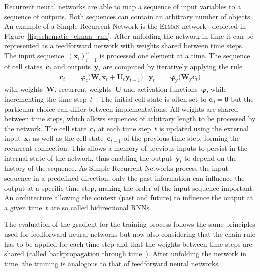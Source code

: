 Recurrent neural networks are able to map a sequence of input variables to a
sequence of outputs. Both sequences can contain an arbitrary number of objects.
An example of a Simple Recurrent Network is the \textsc{Elman}
network~\cite{elman} depicted in Figure~\ref{fig:schematic_elman_rnn}. After
unfolding the network in time it can be represented as a feedforward network
with weights shared between time steps. The input
sequence~$\left( \mathbf{x}_i \right)_{i=1}^n$ is processed one element at a
time. The sequence of cell states~$\mathbf{c}_t$ and outputs~$\mathbf{y}_t$ are
computed by iteratively applying the rule
\begin{align*}
  \mathbf{c}_t &= \bm{\varphi}_{\text{c}}\Big( \mathbf{W}_{\text{c}} \mathbf{x}_{t} + \mathbf{U}_{\text{c}} \mathbf{y}_{t-1} \Big)
  &\mathbf{y}_t &= \bm{\varphi}_{\text{y}}\Big( \mathbf{W}_{\text{y}} \mathbf{c}_{t} \Big)
\end{align*}
with weights~$\mathbf{W}$, recurrent weights~$\mathbf{U}$ and activation
functions~$\bm{\varphi}$, while incrementing the time step~$t$~\cite{elman,
  graves}. The initial cell state is often set to $\mathbf{c}_0 = \mathbf{0}$
but the particular choice can differ between implementations. All weights are
shared between time steps, which allows sequences of arbitrary length to be
processed by the network. The cell state~$\mathbf{c}_t$ at each time step~$t$ is
updated using the external input~$\mathbf{x}_t$ as well as the cell
state~$\mathbf{c}_{t-1}$ of the previous time step, forming the recurrent
connection. This allows a memory of previous inputs to persist in the internal
state of the network, thus enabling the output~$\mathbf{y}_t$ to depend on the
history of the sequence. As Simple Recurrent Networks process the input sequence
in a predefined direction, only the past information can influence the output at
a specific time step, making the order of the input sequence important. An
architecture allowing the context (past and future) to influence the output at a
given time~$t$ are so called bidirectional RNNs.

The evaluation of the gradient for the training process follows the same
principles used for feedforward neural networks but now also considering that
the chain rule has to be applied for each time step and that the weights between
time steps are shared (called backpropagation through
time~\cite{williams_zipser}). After unfolding the network in time, the training
is analogous to that of feedforward neural networks.


